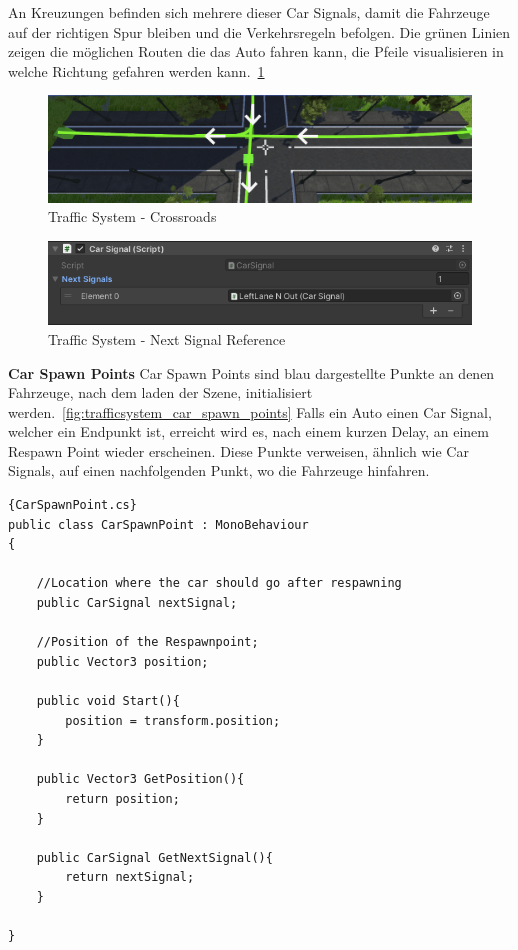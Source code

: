 An Kreuzungen befinden sich mehrere dieser Car Signals, damit die Fahrzeuge auf der richtigen Spur bleiben und die Verkehrsregeln befolgen.
Die gr\"unen Linien zeigen die m\"oglichen Routen die das Auto fahren kann, die Pfeile visualisieren in welche Richtung gefahren werden kann.~\ref{fig:trafficsystem_crossroads}



\begin{figure}
    \centering
    \includegraphics[scale=0.5]{pics/trafficsystem_carsignal_crossroads}
    \caption{Traffic System - Crossroads}
    \label{fig:trafficsystem_crossroads}
\end{figure}

\begin{figure}
    \centering
    \includegraphics[scale=0.7]{pics/trafficsystem_carsignal_signal_reference}
    \caption{Traffic System - Next Signal Reference}
    \label{fig:trafficsystem_next_signal_reference}
\end{figure}


\textbf{Car Spawn Points}
Car Spawn Points sind blau dargestellte Punkte an denen Fahrzeuge, nach dem laden der Szene, initialisiert werden.~\ref{fig:trafficsystem_car_spawn_points}
Falls ein Auto einen Car Signal, welcher ein Endpunkt ist, erreicht wird es, nach einem kurzen Delay, an einem Respawn Point wieder erscheinen.
Diese Punkte verweisen, \"ahnlich wie Car Signals, auf einen nachfolgenden Punkt, wo die Fahrzeuge hinfahren.

\begin{lstlisting}{CarSpawnPoint.cs}
public class CarSpawnPoint : MonoBehaviour
{

    //Location where the car should go after respawning
    public CarSignal nextSignal;

    //Position of the Respawnpoint;
    public Vector3 position;

    public void Start(){
        position = transform.position;
    }

    public Vector3 GetPosition(){
        return position;
    }

    public CarSignal GetNextSignal(){
        return nextSignal;
    }

}
\end{lstlisting}


